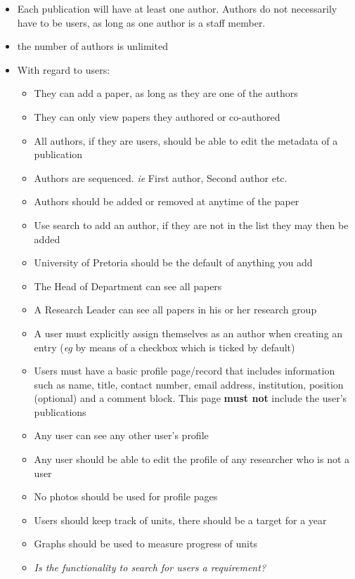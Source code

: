 \documentclass[a4paper,12pt]{article}
\begin{document}
\begin{itemize}
\item Each publication will have at least one author. Authors do not necessarily have to be users, as long as one author is a staff member.
\item the number of authors is unlimited
\item With regard to users:
\begin{itemize}
\item They can add a paper, as long as they are one of the authors
\item They can only view papers they authored or co-authored
\item All authors, if they are users, should be able to edit the metadata of a publication
\item Authors are sequenced. \textit{ie} First author, Second author etc.
\item Authors should be added or removed at anytime of the paper
\item Use search to add an author, if they are not in the list they may then be added 
\item University of Pretoria should be the default of anything you add 
\item The Head of Department can see all papers
\item A Research Leader can see all papers in his or her research group
\item A user must explicitly assign themselves as an author when creating an entry (\textit{eg} by means of a checkbox which is ticked by default)
\item Users must have a basic profile page/record that includes information such as name, 
title, contact number, email address, institution, position (optional) and a comment block. This page \textbf{must not} include the user's publications
\item Any user can see any other user's profile
\item Any user should be able to edit the profile of any researcher who is not a user
\item No photos should be used for profile pages
\item Users should keep track of units, there should be a target for a year
\item Graphs should be used to measure progress of units
\item \textit{Is the functionality to search for users a requirement?}
\end{itemize}


\end{itemize}
\end{document}
